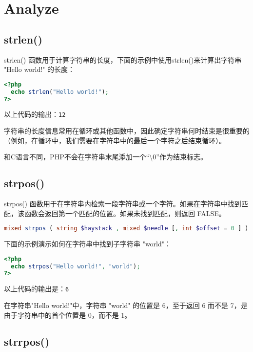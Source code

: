 \section{Analyze}



\subsection{strlen()}


strlen() 函数用于计算字符串的长度，下面的示例中使用strlen()来计算出字符串 "Hello world!" 的长度：

\begin{lstlisting}[language=PHP]
<?php
  echo strlen("Hello world!");
?>
\end{lstlisting}


以上代码的输出：\verb|12|

字符串的长度信息常用在循环或其他函数中，因此确定字符串何时结束是很重要的（例如，在循环中，我们需要在字符串中的最后一个字符之后结束循环）。

和C语言不同，PHP不会在字符串末尾添加一个“\textbackslash 0”作为结束标志。

\subsection{strpos()}

strpos() 函数用于在字符串内检索一段字符串或一个字符。如果在字符串中找到匹配，该函数会返回第一个匹配的位置。如果未找到匹配，则返回 FALSE。

\begin{lstlisting}[language=PHP]
mixed strpos ( string $haystack , mixed $needle [, int $offset = 0 ] )
\end{lstlisting}

下面的示例演示如何在字符串中找到子字符串 "world"：



\begin{lstlisting}[language=PHP]
<?php
  echo strpos("Hello world!", "world");
?>
\end{lstlisting}

以上代码的输出是：\verb|6|

在字符串"Hello world!"中，字符串 "world" 的位置是 6，至于返回 6 而不是 7，是由于字符串中的首个位置是 0，而不是 1。

\subsection{strrpos()}

